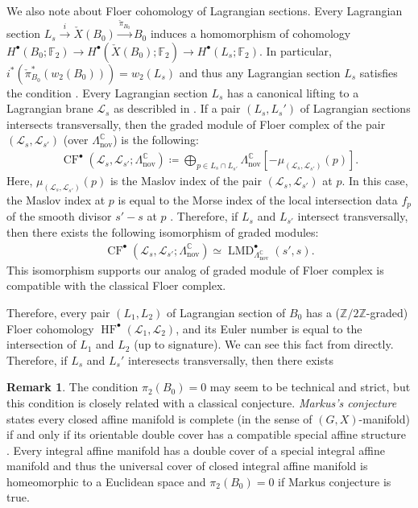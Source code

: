 \documentclass[a4paper,dvipdfmx,reqno,12pt]{amsart}
\makeatletter
\newcommand{\ind}[2]{\emph{#1}\index{1{#2}@{#1}}}
\theoremstyle{definition}
\newtheorem{remark}[theorem]{Remark}
\newcommand{\deq}{\coloneqq}
\newcommand{\opn}[1]{\operatorname{#1}}
\newcommand{\xto}[1]{\xrightarrow{#1}}
\numberwithin{equation}{section}
\makeatother
\begin{document}
We also note about Floer cohomology of 
Lagrangian sections.
Every Lagrangian section
$L_s\xto{i} \check{X}(B_0)\xto{\check{\pi}_{B_0}}  B_0$
induces a homomorphism of 
cohomology 
$H^{\bullet}(B_0;\mathbb{F}_2)\to 
H^{\bullet}(\check{X}(B_0);\mathbb{F}_2)
\to 
H^{\bullet}(L_s;\mathbb{F}_2)$.
In particular, 
$i^{*}(\check{\pi}_{B_0}^{*}(w_2(B_0)))=w_2(L_s)$ and 
thus any Lagrangian section $L_s$ satisfies the 
condition \cite[(2.54)]{MR3656481}.
Every Lagrangian section $L_s$ has 
a canonical lifting to a Lagrangian 
brane $\mathscr{L}_s$ as describled in 
\cite[5.2]{MR1882331}.
If a pair $(L_s,L_s')$ of Lagrangian sections 
intersects transversally, then the graded 
module of Floer complex of the pair
$(\mathscr{L}_s,\mathscr{L}_{s'})$
(over $\Lambda_{\opn{nov}}^{\mathbb{C}}$) 
is the following:
\begin{align}
\opn{CF}^{\bullet}(\mathscr{L}_s,\mathscr{L}_{s'};
\Lambda_{\opn{nov}}^{\mathbb{C}})
\deq \bigoplus_{p\in L_s\cap L_{s'}}
\Lambda_{\opn{nov}}^{\mathbb{C}}
[-\mu_{(\mathscr{L}_s,\mathscr{L}_{s'})}(p)].
\end{align}
Here, $\mu_{(\mathscr{L}_s,\mathscr{L}_{s'})}(p)$ is 
the Maslov index of the pair 
$(\mathscr{L}_s,\mathscr{L}_{s'})$ at $p$.
In this case, the Maslov index at $p$
is equal to the Morse index of the 
local intersection data $f_{p}$ of 
the smooth divisor $s'-s$ at $p$
\cite[Remark 13]{MR1882331}. Therefore, 
if $L_s$ and $L_{s'}$ intersect 
transversally, then there exists the following
isomorphism of graded modules:
\begin{align}
\opn{CF}^{\bullet}(\mathscr{L}_s,\mathscr{L}_{s'};
\Lambda_{\opn{nov}}^{\mathbb{C}})
\simeq 
\opn{LMD}^{\bullet}_{\Lambda_{\opn{nov}}^{\mathbb{C}}}
(s',s).
\end{align}
This isomorphism supports our analog of graded module
of Floer complex is compatible with the classical 
Floer complex.

Therefore, every pair $(L_1,L_2)$ of Lagrangian section
of $B_0$ has a ($\mathbb{Z}/2\mathbb{Z}$-graded)
Floer cohomology $\opn{HF}^{\bullet}(\mathscr{L}_1,
\mathscr{L}_2)$, and its Euler number is equal to the intersection of 
$L_1$ and $L_2$ (up to signature). We can 
see this fact from \cite[Remark 13]{MR1882331} directly.
Therefore, if $L_s$ and $L_s'$ interesects 
transversally, then there exists 


\begin{remark}
The condition $\pi_2(B_0)=0$ may seem to be technical
and strict, but this condition is 
closely related with a classical conjecture.
\ind{Markus's conjecture}{Markus conjecture} states every closed
affine manifold is complete (in the sense of $(G,X)$-manifold)
if and only if its orientable double cover 
has a compatible special affine structure 
\cite[p.53]{markus1963cosmological}.
Every integral affine manifold has a double cover of 
a special integral affine manifold and thus 
the universal cover of closed integral affine 
manifold is homeomorphic to a Euclidean space and 
$\pi_{2}(B_0)=0$ if Markus conjecture 
is true.
\end{remark}
\end{document}
